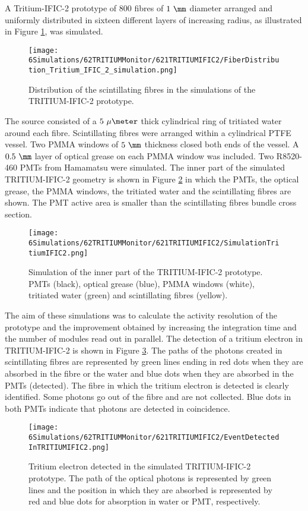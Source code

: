 A Tritium-IFIC-2 prototype of $800$ fibres of $1~\mm$ diameter arranged and uniformly distributed in sixteen different layers of increasing radius, as illustrated in Figure \ref{fig:FibersTritiumIFIC2Simulation}, was simulated.
\begin{figure}[h]
\centering
\texttt{[image: 6Simulations/62TRITIUMMonitor/621TRITIUMIFIC2/FiberDistribution\_Tritium\_IFIC\_2\_simulation.png]}
\caption{Distribution of the scintillating fibres in the simulations of the TRITIUM-IFIC-2 prototype.\label{fig:FibersTritiumIFIC2Simulation}}
\end{figure}
The source consisted of a $5~\mu\meter$ thick cylindrical ring of tritiated water around each fibre. Scintillating fibres were arranged within a cylindrical PTFE vessel. Two PMMA windows of $5~\mm$ thickness closed both ends of the vessel. A $0.5~\mm$ layer of optical grease on each PMMA window was included. Two R8520-460 PMTs from Hamamatsu \cite{DataSheetPMTs} were simulated. The inner part of the simulated TRITIUM-IFIC-2 geometry is shown in Figure \ref{fig:TritiumIFIC2Simulation} in which the PMTs, the optical grease, the PMMA windows, the tritiated water and the scintillating fibres are shown. The PMT active area is smaller than the scintillating fibres bundle cross section.
\begin{figure}[h]
\centering
\texttt{[image: 6Simulations/62TRITIUMMonitor/621TRITIUMIFIC2/SimulationTritiumIFIC2.png]}
\caption{Simulation of the inner part of the TRITIUM-IFIC-2 prototype. PMTs (black), optical grease (blue), PMMA windows (white), tritiated water (green) and scintillating fibres (yellow). \label{fig:TritiumIFIC2Simulation}}
\end{figure}
The aim of these simulations was to calculate the activity resolution of the prototype and the improvement obtained by increasing the integration time and the number of modules read out in parallel. The detection of a tritium electron in TRITIUM-IFIC-2 is shown in Figure \ref{fig:TritiumEventDetectedInSimulatedPrototype}. The paths of the photons created in scintillating fibres are represented by green lines ending in red dots when they are absorbed in the fibre or the water and blue dots when they are absorbed in the PMTs (detected). The fibre in which the tritium electron is detected is clearly identified. Some photons go out of the fibre and are not collected. Blue dots in both PMTs indicate that photons are detected in coincidence.
\begin{figure}[hbtp]
\centering
\texttt{[image: 6Simulations/62TRITIUMMonitor/621TRITIUMIFIC2/EventDetectedInTRITIUMIFIC2.png]}
\caption{Tritium electron detected in the simulated TRITIUM-IFIC-2 prototype. The path of the optical photons is represented by green lines and the position in which they are absorbed is represented by red and blue dots for absorption in water or PMT, respectively.\label{fig:TritiumEventDetectedInSimulatedPrototype}}
\end{figure}
